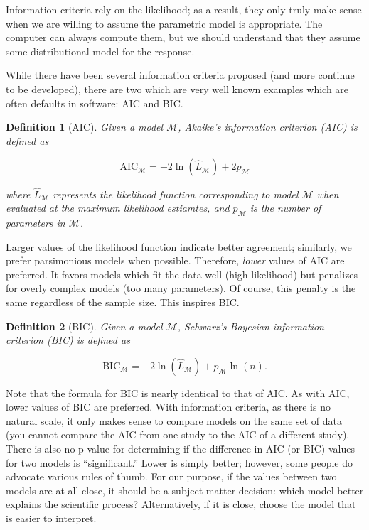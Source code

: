\documentclass[
]{book}
\theoremstyle{plain}
\theoremstyle{mydefn}
\newtheorem{definition}{Definition}[chapter]
\theoremstyle{myexmpl}
\theoremstyle{remark}
\begin{document}
\begin{rmdwarning}
Information criteria rely on the likelihood; as a result, they only truly make sense when we are willing to assume the parametric model is appropriate. The computer can always compute them, but we should understand that they assume some distributional model for the response.
\end{rmdwarning}

While there have been several information criteria proposed (and more continue to be developed), there are two which are very well known examples which are often defaults in software: AIC and BIC.

\begin{definition}[AIC]
\protect\hypertarget{def:defn-aic}{}{\label{def:defn-aic} {} }Given a model \(\mathcal{M}\), Akaike's information criterion (AIC) is defined as

\[\text{AIC}_{\mathcal{M}} = -2\ln\left(\widehat{L}_{\mathcal{M}}\right) + 2p_{\mathcal{M}}\]

where \(\widehat{L}_{\mathcal{M}}\) represents the likelihood function corresponding to model \(\mathcal{M}\) when evaluated at the maximum likelihood estiamtes, and \(p_{\mathcal{M}}\) is the number of parameters in \(\mathcal{M}\).\\
\end{definition}

Larger values of the likelihood function indicate better agreement; similarly, we prefer parsimonious models when possible. Therefore, \emph{lower} values of AIC are preferred. It favors models which fit the data well (high likelihood) but penalizes for overly complex models (too many parameters). Of course, this penalty is the same regardless of the sample size. This inspires BIC.

\begin{definition}[BIC]
\protect\hypertarget{def:defn-bic}{}{\label{def:defn-bic} {} }Given a model \(\mathcal{M}\), Schwarz's Bayesian information criterion (BIC) is defined as

\[\text{BIC}_{\mathcal{M}} = -2\ln\left(\widehat{L}_{\mathcal{M}}\right) + p_{\mathcal{M}} \ln(n).\]
\end{definition}

Note that the formula for BIC is nearly identical to that of AIC. As with AIC, lower values of BIC are preferred. With information criteria, as there is no natural scale, it only makes sense to compare models on the same set of data (you cannot compare the AIC from one study to the AIC of a different study). There is also no p-value for determining if the difference in AIC (or BIC) values for two models is ``significant.'' Lower is simply better; however, some people do advocate various rules of thumb. For our purpose, if the values between two models are at all close, it should be a subject-matter decision: which model better explains the scientific process? Alternatively, if it is close, choose the model that is easier to interpret.
\end{document}
